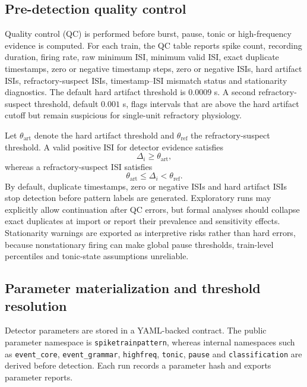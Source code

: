 \documentclass[pdflatex,sn-apa]{sn-jnl}
\begin{document}
\subsection{Pre-detection quality control}

Quality control (QC) is performed before burst, pause, tonic or high-frequency evidence is computed. For each train, the QC table reports spike count, recording duration, firing rate, raw minimum ISI, minimum valid ISI, exact duplicate timestamps, zero or negative timestamp steps, zero or negative ISIs, hard artifact ISIs, refractory-suspect ISIs, timestamp--ISI mismatch status and stationarity diagnostics. The default hard artifact threshold is $0.0009$ s. A second refractory-suspect threshold, default $0.001$ s, flags intervals that are above the hard artifact cutoff but remain suspicious for single-unit refractory physiology.

Let $\theta_{\mathrm{art}}$ denote the hard artifact threshold and $\theta_{\mathrm{ref}}$ the refractory-suspect threshold. A valid positive ISI for detector evidence satisfies
\begin{equation}
    \Delta_i \ge \theta_{\mathrm{art}},
\end{equation}
whereas a refractory-suspect ISI satisfies
\begin{equation}
    \theta_{\mathrm{art}} \le \Delta_i < \theta_{\mathrm{ref}}.
\end{equation}
By default, duplicate timestamps, zero or negative ISIs and hard artifact ISIs stop detection before pattern labels are generated. Exploratory runs may explicitly allow continuation after QC errors, but formal analyses should collapse exact duplicates at import or report their prevalence and sensitivity effects. Stationarity warnings are exported as interpretive risks rather than hard errors, because nonstationary firing can make global pause thresholds, train-level percentiles and tonic-state assumptions unreliable.

\subsection{Parameter materialization and threshold resolution}

Detector parameters are stored in a YAML-backed contract. The public parameter namespace is \texttt{spiketrainpattern}, whereas internal namespaces such as \texttt{event\_core}, \texttt{event\_grammar}, \texttt{highfreq}, \texttt{tonic}, \texttt{pause} and \texttt{classification} are derived before detection. Each run records a parameter hash and exports parameter reports.
\end{document}
